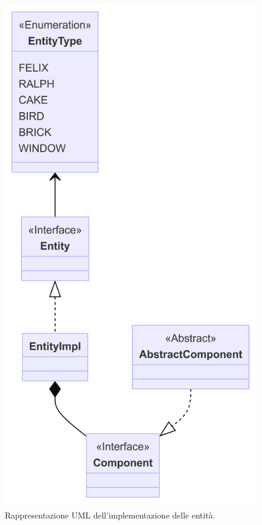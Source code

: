 \begin{figure}[H]
\centering{}
\includegraphics[width=\textwidth]{img/entities.png}
\caption{Rappresentazione UML dell'implementazione delle entità.}
\end{figure}

